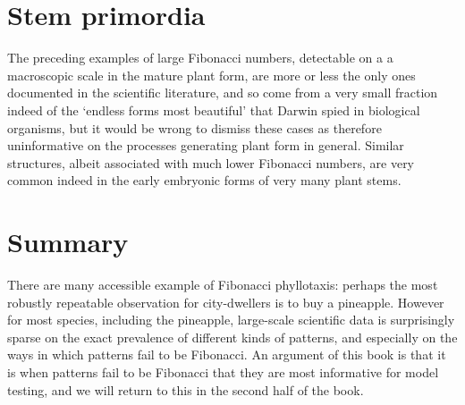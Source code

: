 \section{Stem primordia}
The preceding examples of large Fibonacci numbers, detectable on a a macroscopic scale in the mature plant form, are more or less the only ones documented in the scientific literature, and so come from a very small fraction indeed of the `endless forms most beautiful' that Darwin spied in biological organisms, but it would be wrong to dismiss these cases as therefore uninformative on the processes generating plant form in general. Similar structures, albeit associated with much lower Fibonacci numbers, are very common indeed in the early embryonic forms of very many plant stems. 
 \section{Summary}
 There are many accessible example of Fibonacci phyllotaxis: perhaps the most robustly repeatable observation for city-dwellers is to buy a pineapple. However for most species, including the pineapple,  large-scale scientific data is surprisingly sparse on the exact prevalence of different kinds of patterns, and especially on the ways in which patterns fail to be Fibonacci. An argument of this book is that it is when patterns fail to be Fibonacci that they are most informative for model testing, and we will return to this in the second half of the book. 
